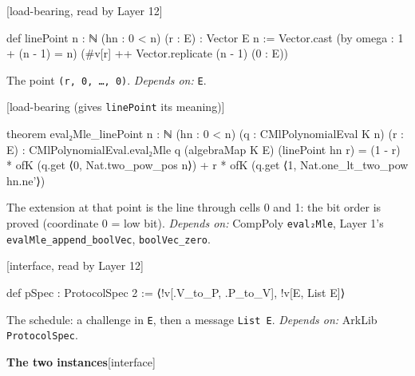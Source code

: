\par\medskip\noindent\textbf{}\hfill\textsf{\small [load-bearing, read by Layer 12]}\par\nopagebreak

\begin{leancode}
def linePoint {n : ℕ} (hn : 0 < n) (r : E) : Vector E n := Vector.cast (by omega : 1 + (n - 1) = n) (#v[r] ++ Vector.replicate (n - 1) (0 : E))
\end{leancode}


The point \texttt{(\allowbreak{}r,\allowbreak{} 0,\allowbreak{} …,\allowbreak{} 0)}. \emph{Depends on:} \texttt{E}.

\par\medskip\noindent\textbf{}\hfill\textsf{\small [load-bearing (gives \texttt{linePoint} its meaning)]}\par\nopagebreak

\begin{leancode}
theorem eval₂Mle_linePoint {n : ℕ} (hn : 0 < n) (q : CMlPolynomialEval K n) (r : E) : CMlPolynomialEval.eval₂Mle q (algebraMap K E) (linePoint hn r) = (1 - r) * ofK (q.get ⟨0, Nat.two_pow_pos n⟩) + r * ofK (q.get ⟨1, Nat.one_lt_two_pow hn.ne'⟩)
\end{leancode}


The extension at that point is the line through cells 0 and 1: the bit order is proved (coordinate 0 = low bit). \emph{Depends on:} CompPoly \texttt{eval₂Mle}, Layer 1's \texttt{evalMle\_\allowbreak{}append\_\allowbreak{}boolVec}, \texttt{boolVec\_\allowbreak{}zero}.

\par\medskip\noindent\textbf{}\hfill\textsf{\small [interface, read by Layer 12]}\par\nopagebreak

\begin{leancode}
def pSpec : ProtocolSpec 2 := ⟨!v[.V_to_P, .P_to_V], !v[E, List E]⟩
\end{leancode}


The schedule: a challenge in \texttt{E}, then a message \texttt{List E}. \emph{Depends on:} ArkLib \texttt{ProtocolSpec}.

\par\medskip\noindent\textbf{The two instances}\hfill\textsf{\small [interface]}\par\nopagebreak

